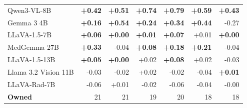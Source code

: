 \begin{table}[htbp]
{\begin{tabular}{lrrrrrr}
Qwen3-VL-8B & \cellcolor{cfTerra4}\textbf{+0.42} & \cellcolor{cfTerra4}\textbf{+0.51} & \cellcolor{cfTerra4}\textbf{+0.74} & \cellcolor{cfTerra4}\textbf{+0.79} & \cellcolor{cfTerra4}\textbf{+0.59} & \cellcolor{cfTerra4}\textbf{+0.43} \\
Gemma 3 4B & \cellcolor{cfTerra3}\textbf{+0.16} & \cellcolor{cfTerra4}\textbf{+0.54} & \cellcolor{cfTerra3}\textbf{+0.24} & \cellcolor{cfTerra4}\textbf{+0.34} & \cellcolor{cfTerra4}\textbf{+0.44} & \cellcolor{cfSlate4}-0.27 \\
LLaVA-1.5-7B & \cellcolor{cfTerra2}\textbf{+0.06} & \cellcolor{cfTerra1}\textbf{+0.00} & \cellcolor{cfTerra1}\textbf{+0.01} & \cellcolor{cfTerra2}\textbf{+0.07} & \cellcolor{cfTerra1}+0.01 & \cellcolor{cfTerra1}\textbf{+0.00} \\
MedGemma 27B & \cellcolor{cfTerra4}\textbf{+0.33} & \cellcolor{cfSlate2}-0.04 & \cellcolor{cfTerra2}\textbf{+0.08} & \cellcolor{cfTerra3}\textbf{+0.18} & \cellcolor{cfTerra3}\textbf{+0.21} & \cellcolor{cfSlate2}-0.04 \\
LLaVA-1.5-13B & \cellcolor{cfTerra2}\textbf{+0.05} & \cellcolor{cfTerra1}\textbf{+0.00} & \cellcolor{cfTerra1}+0.02 & \cellcolor{cfTerra2}\textbf{+0.08} & \cellcolor{cfTerra1}+0.02 & \cellcolor{cfSlate2}-0.03 \\
Llama 3.2 Vision 11B & \cellcolor{cfSlate2}-0.03 & \cellcolor{cfSlate2}-0.02 & \cellcolor{cfTerra2}+0.02 & \cellcolor{cfSlate1}-0.02 & \cellcolor{cfSlate2}-0.04 & \cellcolor{cfTerra1}\textbf{+0.01} \\
LLaVA-Rad-7B & \cellcolor{cfSlate2}-0.06 & \cellcolor{cfTerra1}+0.01 & \cellcolor{cfSlate2}-0.02 & \cellcolor{cfSlate2}-0.06 & \cellcolor{cfSlate2}-0.04 & \cellcolor{cfSlate1}-0.00 \\
\midrule
\textbf{Owned} & 21 & 21 & 19 & 20 & 18 & 18 \\
\bottomrule
\end{tabular}}
\end{table}
